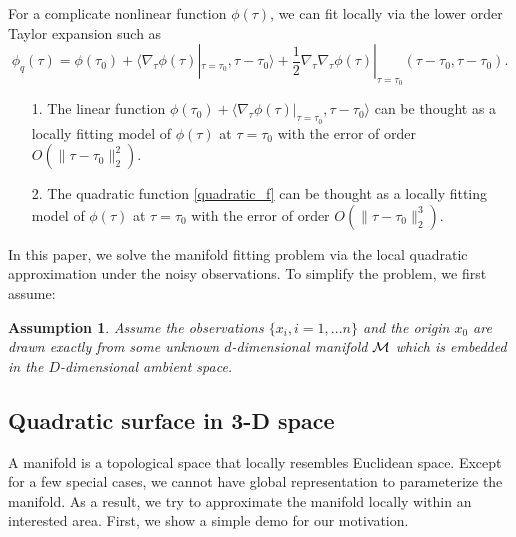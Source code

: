 \documentclass[aos,preprint]{imsart}
\newtheorem{assumption}[theorem]{Assumption}
\theoremstyle{remark}
\begin{document}
For a complicate nonlinear function $\phi(\tau)$, we can fit locally via the lower order Taylor expansion such as
\begin{equation}\label{quadratic_f}
\phi_q(\tau) = \phi(\tau_0) + \langle \nabla_\tau \phi(\tau)|_{\tau=\tau_0}, \tau-\tau_0 \rangle + \frac{1}{2} \nabla_\tau \nabla_\tau \phi(\tau)|_{\tau=\tau_0} (\tau-\tau_0,\tau-\tau_0).
\end{equation}
\begin{itemize}
\item[1.] The linear function
$
\phi(\tau_0) + \langle \nabla_\tau \phi(\tau)|_{\tau=\tau_0}, \tau-\tau_0 \rangle
$ 
can be thought as a locally fitting model of $\phi(\tau)$ at $\tau=\tau_0$ with the error of order $O(\|\tau-\tau_0 \|_2^2)$.
\item[2.] The quadratic function \eqref{quadratic_f} can be thought as a locally fitting model of $\phi(\tau)$ at $\tau=\tau_0$ with the error of order $O(\|\tau-\tau_0 \|_2^3)$.
\end{itemize}
In this paper, we solve the manifold fitting problem via the local quadratic approximation under the noisy observations. To simplify the problem, we first assume:
\begin{assumption}
Assume the observations $\{x_i, i=1,...n\}$ and the origin $x_0$ are drawn exactly from some unknown $d$-dimensional manifold $\cal M$ which is embedded in the $D$-dimensional ambient space.
\end{assumption}

\subsection{Quadratic surface in 3-D space}
A manifold is a topological space that locally resembles Euclidean space. Except for a few special cases, we cannot have global representation to parameterize the manifold. As a result, we try to approximate the manifold locally within an interested area. First, we show a simple demo for our motivation.
\end{document}
